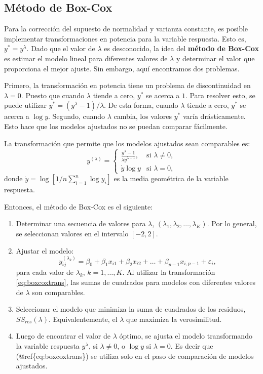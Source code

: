 \documentclass[
]{article}
\providecommand{\tightlist}{%
  \setlength{\itemsep}{0pt}\setlength{\parskip}{0pt}}
\begin{document}
\hypertarget{muxe9todo-de-box-cox}{%
\subsection{Método de Box-Cox}\label{muxe9todo-de-box-cox}}

Para la corrección del supuesto de normalidad y varianza constante, es posible implementar transformaciones en potencia para la variable respuesta. Esto es, \(y^{*}=y^{\lambda}\). Dado que el valor de \(\lambda\) es desconocido, la idea del \textbf{método de Box-Cox} es estimar el modelo lineal para diferentes valores de \(\lambda\) y determinar el valor que proporciona el mejor ajuste. Sin embargo, aquí encontramos dos problemas.

Primero, la transformación en potencia tiene un problema de discontinuidad en \(\lambda=0\). Puesto que cuando \(\lambda\) tiende a cero, \(y^{*}\) se acerca a \(1\). Para resolver esto, se puede utilizar \(y^{*} = (y^{\lambda}-1)/\lambda\). De esta forma, cuando \(\lambda\) tiende a cero, \(y^{*}\) se acerca a \(\log y\). Segundo, cuando \(\lambda\) cambia, los valores \(y^{*}\) varía drásticamente. Esto hace que los modelos ajustados no se puedan comparar fácilmente.

La transformación que permite que los modelos ajustados sean comparables es:
\begin{equation}
y^{(\lambda)} = \begin{cases}
\frac{y^{\lambda}-1}{\lambda \dot{y}^{\lambda-1}}, & \mbox{si }\lambda \neq 0, \\
\dot{y}\log y & \mbox{si } \lambda=0,
\end{cases}
\label{eq:boxcoxtrans}
\end{equation}
donde \(\dot{y} = \log \left[1/n \sum_{i=1}^{n}\log y_{i}\right]\) es la media geométrica de la variable respuesta.

Entonces, el método de Box-Cox es el siguiente:

\begin{enumerate}
\def\labelenumi{\arabic{enumi}.}
\tightlist
\item
  Determinar una secuencia de valores para \(\lambda\), \((\lambda_{1},\lambda_{2},\ldots,\lambda_{K})\). Por lo general, se seleccionan valores en el intervalo \([-2,2]\).
\item
  Ajustar el modelo:
  \[
  y_{ij}^{(\lambda_k)} = \beta_{0} + \beta_{1}x_{i1} + \beta_{2}x_{i2} + \ldots + \beta_{p-1}x_{i,p-1} + \varepsilon_{i},
  \]
  para cada valor de \(\lambda_{k}\), \(k=1,\ldots,K\). Al utilizar la transformación \eqref{eq:boxcoxtrans}, las sumas de cuadrados para modelos con diferentes valores de \(\lambda\) son comparables.
\item
  Seleccionar el modelo que minimiza la suma de cuadrados de los residuos, \(SS_{res}(\lambda)\). Equivalentemente, el \(\lambda\) que maximiza la verosimilitud.
\item
  Luego de encontrar el valor de \(\lambda\) óptimo, se ajusta el modelo transformando la variable respuesta \(y^{\lambda}\), si \(\lambda\neq 0\), o \(\log y\) si \(\lambda =0\). Es decir que (@ref\{eq:boxcoxtrans\}) se utiliza solo en el paso de comparación de modelos ajustados.
\end{enumerate}
\end{document}
